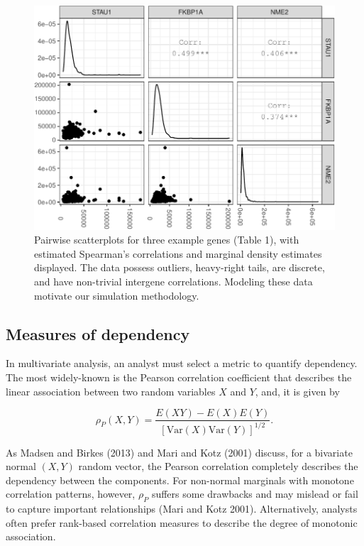 \documentclass{article}
\begin{document}
\begin{figure}
\centering
\includegraphics{ch010-realDataFig-1.pdf}
\caption{\label{fig:ch010-realDataFig}Pairwise scatterplots for three
example genes (Table 1), with estimated Spearman's correlations and
marginal density estimates displayed. The data possess outliers,
heavy-right tails, are discrete, and have non-trivial intergene
correlations. Modeling these data motivate our simulation methodology.}
\end{figure}

\hypertarget{measures-of-dependency}{%
\subsection{Measures of dependency}\label{measures-of-dependency}}

In multivariate analysis, an analyst must select a metric to quantify
dependency. The most widely-known is the Pearson correlation coefficient
that describes the linear association between two random variables \(X\)
and \(Y\), and, it is given by

\begin{equation}
\rho_P(X,Y) = \frac{E(XY) - E(X)E(Y)}{\left[ \mathrm{Var}(X)\mathrm{Var}(Y)\right]^{1/2}}.
\label{eq:pearson}
\end{equation}

As Madsen and Birkes (2013) and Mari and Kotz (2001) discuss, for a
bivariate normal \((X,Y)\) random vector, the Pearson correlation
completely describes the dependency between the components. For
non-normal marginals with monotone correlation patterns, however,
\(\rho_P\) suffers some drawbacks and may mislead or fail to capture
important relationships (Mari and Kotz 2001). Alternatively, analysts
often prefer rank-based correlation measures to describe the degree of
monotonic association.
\end{document}
